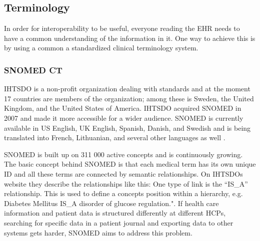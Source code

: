 \documentclass[14pt]{article}
\begin{document}




\subsection{Terminology}
\label{sec:TechnicalStandardsTerminology}
In order for interoperability to be useful, everyone reading the \gls{EHR} needs to have a common understanding of the information in it. One way to achieve this is by using a common a standardized clinical terminology system.

\subsubsection{SNOMED CT}

\gls{IHTSDO} is a non-profit organization dealing with standards and at the moment 17 countries are members of the organization; among these is Sweden, the United Kingdom, and the United States of America. \gls{IHTSDO} acquired \gls{SNOMED} in 2007 and made it more accessible for a wider audience. \gls{SNOMED} is currently available in US English, UK English, Spanish, Danish, and Swedish and is being translated into French, Lithuanian, and several other languages as well \cite{ihtsdolang}.

\gls{SNOMED} is built up on 311 000 active concepts and is continuously growing. The basic concept behind \gls{SNOMED} is that each medical term has its own unique ID and all these terms are connected by semantic relationships. On \gls{IHTSDO}s website they describe the relationships like this: One type of link is the “IS\_A” relationship. This is used to define a concepts position within a hierarchy, e.g. Diabetes Mellitus IS\_A disorder of glucose regulation."\cite{ihtsdocomp}. If health care information and patient data is structured differently at different \glspl{HCP}, searching for specific data in a patient journal and exporting data to other systems gets harder, \gls{SNOMED} aims to address this problem.
\end{document}
